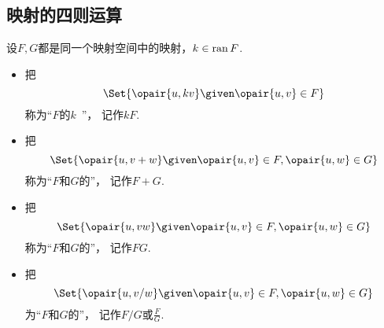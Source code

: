 \subsection{映射的四则运算}
\begin{definition}
设\(F,G\)都是同一个映射空间中的映射，\(k \in \operatorname{ran} F\).
\begin{itemize}
	\item 把\[
		\Set{ \opair{u,kv} \given \opair{u,v} \in F }
	\]称为“\(F\)的\(k\)~”，
	记作\(k F\).
	\item 把\[
		\Set{ \opair{u,v+w} \given \opair{u,v} \in F, \opair{u,w} \in G }
	\]称为“\(F\)和\(G\)的”，
	记作\(F + G\).
	\item 把\[
		\Set{ \opair{u,vw} \given \opair{u,v} \in F, \opair{u,w} \in G }
	\]称为“\(F\)和\(G\)的”，
	记作\(F G\).
	\item 把\[
		\Set{ \opair{u,v/w} \given \opair{u,v} \in F, \opair{u,w} \in G }
	\]为“\(F\)和\(G\)的”，
	记作\(F/G\)或\(\frac{F}{G}\).
\end{itemize}
\end{definition}
